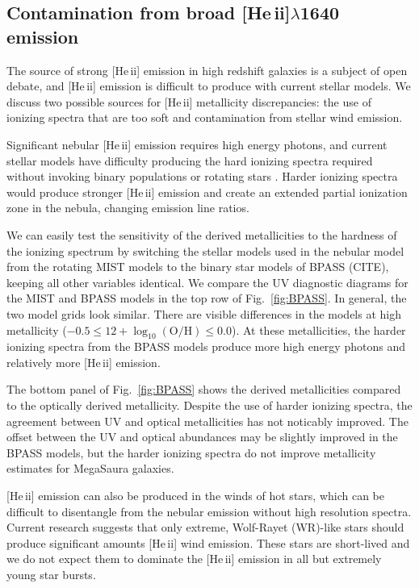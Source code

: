 \documentclass[preprint2]{aastex62}
\newcommand{\heii}{[He\,{\sc ii}]\xspace}
\newcommand{\logten}{\ensuremath{\log_{10}}}
\newcommand{\logOH}{\ensuremath{\logten (\mathrm{O}/\mathrm{H})}\xspace}
\newcommand{\mage}{{\sc Meg}a{\sc S}a{\sc ura}\xspace}
\begin{document}
\subsection{Contamination from broad \heii$\lambda$1640 emission}

The source of strong \heii emission in high redshift galaxies is a subject of open debate, and \heii emission is difficult to produce with current stellar models. We discuss two possible sources for \heii metallicity discrepancies: the use of ionizing spectra that are too soft and contamination from stellar wind emission.

Significant nebular \heii emission requires high energy photons, and current stellar models have difficulty producing the hard ionizing spectra required without invoking binary populations or rotating stars \citep[e.g.,][]{Stark+2014, Steidel+2016, Byler+2017}. Harder ionizing spectra would produce stronger \heii emission and create an extended partial ionization zone in the nebula, changing emission line ratios.

We can easily test the sensitivity of the derived metallicities to the hardness of the ionizing spectrum by switching the stellar models used in the nebular model from the rotating MIST models to the binary star models of BPASS (CITE), keeping all other variables identical. We compare the UV diagnostic diagrams for the MIST and BPASS models in the top row of Fig.~\ref{fig:BPASS}. In general, the two model grids look similar. There are visible differences in the models at high metallicity ($-0.5 \leq 12+\logOH \leq 0.0$). At these metallicities, the harder ionizing spectra from the BPASS models produce more high energy photons and relatively more \heii emission.

The bottom panel of Fig.~\ref{fig:BPASS} shows the derived metallicities compared to the optically derived metallicity. Despite the use of harder ionizing spectra, the agreement between UV and optical metallicities has not noticably improved. The offset between the UV and optical abundances may be slightly improved in the BPASS models, but the harder ionizing spectra do not improve metallicity estimates for \mage galaxies.

\heii emission can also be produced in the winds of hot stars, which can be difficult to disentangle from the nebular emission without high resolution spectra. Current research suggests that only extreme, Wolf-Rayet (WR)-like stars should produce significant amounts \heii wind emission. These stars are short-lived and we do not expect them to dominate the \heii emission in all but extremely young star bursts.
\end{document}
